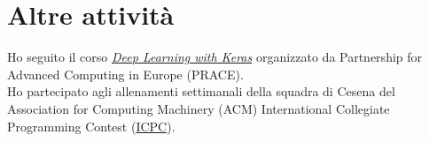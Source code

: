 \documentclass[curriculum-vitae-ita]{subfiles}
\begin{document}
	\section*{Altre attività}
		 Ho seguito il corso \href{https://prace-indico.niif.hu/event/1336/overview}{\textit{Deep Learning with Keras}} organizzato da Partnership for Advanced Computing in Europe (PRACE).\\
	
		 Ho partecipato agli allenamenti settimanali della squadra di Cesena del Association for Computing Machinery (ACM) International Collegiate Programming Contest (\href{https://icpc.global}{ICPC}).
	
\end{document}
